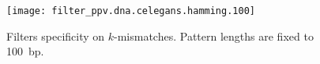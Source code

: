 \begin{figure}[h]
\begin{center}
\caption[Filters specificity on $k$-mismatches]{Filters specificity on $k$-mismatches. Pattern lengths are fixed to 100~bp.}
\label{fig:filter-ppv-hamming-celegans}
\texttt{[image: filter\_ppv.dna.celegans.hamming.100]}
\end{center}
\end{figure}

